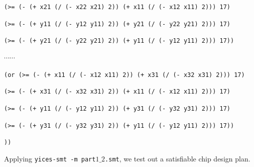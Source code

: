 \documentclass[11pt]{article}
\begin{document}
{{\tt (>= (- (+ x21 (/ (- x22 x21) 2)) (+ x11 (/ (- x12 x11) 2))) 17)}

{\tt (>= (- (+ y11 (/ (- y12 y11) 2)) (+ y21 (/ (- y22 y21) 2))) 17)}

{\tt (>= (- (+ y21 (/ (- y22 y21) 2)) (+ y11 (/ (- y12 y11) 2))) 17))}

$\cdots \cdots$

{\tt (or (>= (- (+ x11 (/ (- x12 x11) 2)) (+ x31 (/ (- x32 x31) 2))) 17)}

{\tt (>= (- (+ x31 (/ (- x32 x31) 2)) (+ x11 (/ (- x12 x11) 2))) 17)}

{\tt (>= (- (+ y11 (/ (- y12 y11) 2)) (+ y31 (/ (- y32 y31) 2))) 17)}

{\tt (>= (- (+ y31 (/ (- y32 y31) 2)) (+ y11 (/ (- y12 y11) 2))) 17))}

{\tt ))}
}

Applying {\tt yices-smt -m part$1\_2$.smt}, we test out a satisfiable chip design plan.
\end{document}
